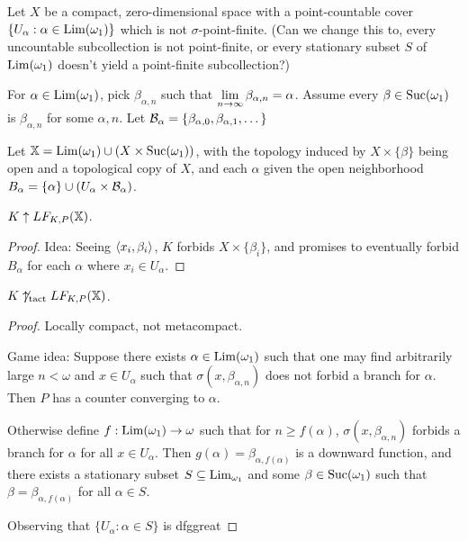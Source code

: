 





\begin{example}
  Let $X$ be a compact, zero-dimensional space with a point-countable cover $\{U_\alpha : \alpha \in \mathrm{Lim}(\omega_1)\}$ which is not $\sigma$-point-finite. (Can we change this to, every uncountable subcollection is not point-finite, or every stationary subset $S$ of $\mathrm{Lim}(\omega_1)$ doesn't yield a point-finite subcollection?)

  For $\alpha \in \mathrm{Lim}(\omega_1)$, pick $\beta_{\alpha,n}$ such that $\displaystyle\lim_{n\to\infty}\beta_{\alpha,n}=\alpha$. Assume every $\beta\in\mathrm{Suc}(\omega_1)$ is $\beta_{\alpha,n}$ for some $\alpha,n$. Let $\mathcal{B}_\alpha = \{\beta_{\alpha,0},\beta_{\alpha,1},\dots\}$

  Let $\mathbb{X} = \mathrm{Lim}(\omega_1) \cup (X \times \mathrm{Suc}(\omega_1))$, with the topology induced by $X\times\{\beta\}$ being open and a topological copy of $X$, and each $\alpha$ given the open neighborhood $B_\alpha = \{\alpha\}\cup(U_\alpha \times \mathcal{B}_\alpha)$.
\end{example}

\begin{theorem}
  $K\uparrow LF_{K,P}(\mathbb{X})$.
\end{theorem}

\begin{proof}
  Idea: Seeing $\langle x_i,\beta_i\rangle$, $K$ forbids $X\times \{\beta_i\}$, and promises to eventually forbid $B_\alpha$ for each $\alpha$ where $x_i \in U_\alpha$.
\end{proof}

\begin{theorem}
  $K\not\uparrow_{\text{tact}}LF_{K,P}(\mathbb{X})$.
\end{theorem}

\begin{proof}
  Locally compact, not metacompact.

  Game idea: Suppose there exists $\alpha\in\mathrm{Lim}(\omega_1)$ such that one may find arbitrarily large $n<\omega$ and $x\in U_\alpha$ such that $\sigma(x,\beta_{\alpha,n})$ does not forbid a branch for $\alpha$. Then $P$ has a counter converging to $\alpha$.

  Otherwise define $f:\mathrm{Lim}(\omega_1)\to\omega$ such that for $n\geq f(\alpha)$, $\sigma(x,\beta_{\alpha,n})$ forbids a branch for $\alpha$ for all $x\in U_\alpha$. Then $g(\alpha) = \beta_{\alpha,f(\alpha)}$ is a downward function, and there exists a stationary subset $S\subseteq \mathrm{Lim}_{\omega_1}$ and some $\beta\in\mathrm{Suc}(\omega_1)$ such that $\beta = \beta_{\alpha,f(\alpha)}$ for all $\alpha\in S$.

  Observing that $\{U_\alpha : \alpha \in S\}$ is dfggreat
\end{proof}


